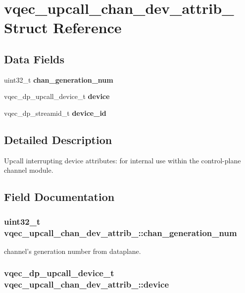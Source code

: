 \section{vqec\_\-upcall\_\-chan\_\-dev\_\-attrib\_\- Struct Reference}
\label{structvqec__upcall__chan__dev__attrib__}
\subsection*{Data Fields}
\begin{CompactItemize}
\item 
uint32\_\-t \bf{chan\_\-generation\_\-num}
\item 
vqec\_\-dp\_\-upcall\_\-device\_\-t \bf{device}
\item 
vqec\_\-dp\_\-streamid\_\-t \bf{device\_\-id}
\end{CompactItemize}


\subsection{Detailed Description}
Upcall interrupting device attributes: for internal use within the control-plane channel module. 



\subsection{Field Documentation}
\subsubsection{\setlength{\rightskip}{0pt plus 5cm}uint32\_\-t \bf{vqec\_\-upcall\_\-chan\_\-dev\_\-attrib\_\-::chan\_\-generation\_\-num}}\label{structvqec__upcall__chan__dev__attrib___3eafc483719887e09a78f1a924629c0f}


channel's generation number from dataplane. 
\subsubsection{\setlength{\rightskip}{0pt plus 5cm}vqec\_\-dp\_\-upcall\_\-device\_\-t \bf{vqec\_\-upcall\_\-chan\_\-dev\_\-attrib\_\-::device}}\label{structvqec__upcall__chan__dev__attrib___fe5115935c4580bce2f220d7f725baf7}



